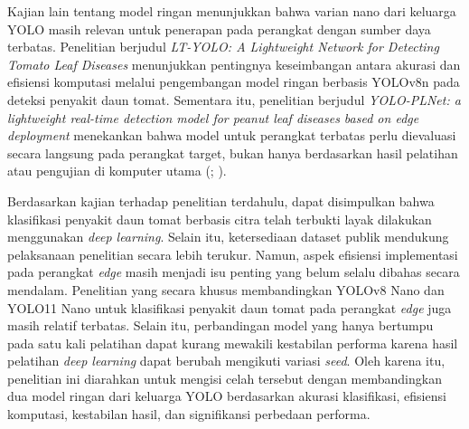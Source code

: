 \begin{sectioncontent}
    Kajian lain tentang model ringan menunjukkan bahwa varian nano dari keluarga YOLO masih relevan untuk penerapan pada perangkat dengan sumber daya terbatas. Penelitian berjudul \textit{LT-YOLO: A Lightweight Network for Detecting Tomato Leaf Diseases} menunjukkan pentingnya keseimbangan antara akurasi dan efisiensi komputasi melalui pengembangan model ringan berbasis YOLOv8n pada deteksi penyakit daun tomat. Sementara itu, penelitian berjudul \textit{YOLO-PLNet: a lightweight real-time detection model for peanut leaf diseases based on edge deployment} menekankan bahwa model untuk perangkat terbatas perlu dievaluasi secara langsung pada perangkat target, bukan hanya berdasarkan hasil pelatihan atau pengujian di komputer utama (\citealp[hlm. 4301--4302 dan 4315]{he2025ltyolo}; \citealp[hlm. 1--2]{sun2025yoloplnet}).

    Berdasarkan kajian terhadap penelitian terdahulu, dapat disimpulkan bahwa klasifikasi penyakit daun tomat berbasis citra telah terbukti layak dilakukan menggunakan \textit{deep learning}. Selain itu, ketersediaan dataset publik mendukung pelaksanaan penelitian secara lebih terukur. Namun, aspek efisiensi implementasi pada perangkat \textit{edge} masih menjadi isu penting yang belum selalu dibahas secara mendalam. Penelitian yang secara khusus membandingkan YOLOv8 Nano dan YOLO11 Nano untuk klasifikasi penyakit daun tomat pada perangkat \textit{edge} juga masih relatif terbatas. Selain itu, perbandingan model yang hanya bertumpu pada satu kali pelatihan dapat kurang mewakili kestabilan performa karena hasil pelatihan \textit{deep learning} dapat berubah mengikuti variasi \textit{seed}. Oleh karena itu, penelitian ini diarahkan untuk mengisi celah tersebut dengan membandingkan dua model ringan dari keluarga YOLO berdasarkan akurasi klasifikasi, efisiensi komputasi, kestabilan hasil, dan signifikansi perbedaan performa.
\end{sectioncontent}


